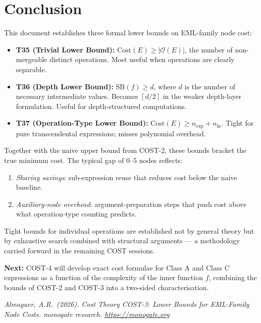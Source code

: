 \documentclass[12pt,a4paper]{article}
\theoremstyle{definition}
\newcommand{\Cost}{\mathrm{Cost}}
\newcommand{\SB}{\mathrm{SB}}
\newcommand{\ceil}[1]{\left\lceil #1 \right\rceil}
\begin{document}
\section{Conclusion}

This document establishes three formal lower bounds on EML-family node cost:

\begin{itemize}
  \item \textbf{T35 (Trivial Lower Bound):} $\Cost(E) \geq |\mathcal{O}(E)|$,
        the number of non-mergeable distinct operations.  Most useful when
        operations are clearly separable.
  \item \textbf{T36 (Depth Lower Bound):} $\SB(f) \geq d$, where $d$ is the
        number of necessary intermediate values.  Becomes $\ceil{d/2}$ in the
        weaker depth-layer formulation.  Useful for depth-structured computations.
  \item \textbf{T37 (Operation-Type Lower Bound):} $\Cost(E) \geq n_{\exp}+n_{\ln}$.
        Tight for pure transcendental expressions; misses polynomial overhead.
\end{itemize}

Together with the naive upper bound from COST-2, these bounds bracket the true
minimum cost.  The typical gap of 0--5 nodes reflects:
\begin{enumerate}
  \item \emph{Sharing savings}: sub-expression reuse that reduces cost below
        the naive baseline.
  \item \emph{Auxiliary-node overhead}: argument-preparation steps that push
        cost above what operation-type counting predicts.
\end{enumerate}
Tight bounds for individual operations are established not by general theory
but by exhaustive search combined with structural arguments — a methodology
carried forward in the remaining COST sessions.

\bigskip
\noindent\textbf{Next:} COST-4 will develop exact cost formulae for Class A
and Class C expressions as a function of the complexity of the inner function
$f$, combining the bounds of COST-2 and COST-3 into a two-sided characterisation.

\bigskip
\noindent\textit{Almaguer, A.R.\ (2026).
Cost Theory COST-3: Lower Bounds for EML-Family Node Costs.
monogate research. \url{https://monogate.org}}
\end{document}
